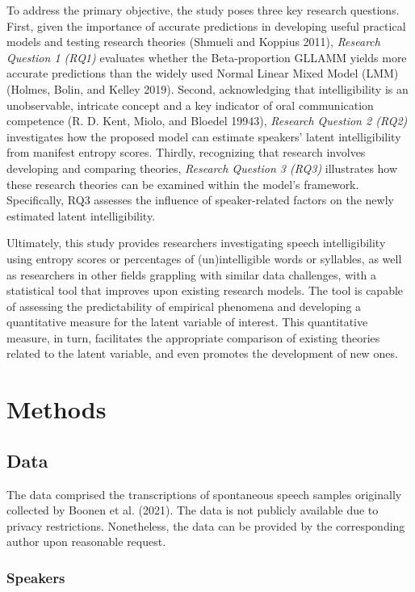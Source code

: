 \documentclass[
sn-apacite
]{sn-jnl}
\begin{document}
To address the primary objective, the study poses three key research
questions. First, given the importance of accurate predictions in
developing useful practical models and testing research theories
(Shmueli and Koppius 2011), \emph{Research Question 1 (RQ1)} evaluates
whether the Beta-proportion GLLAMM yields more accurate predictions than
the widely used Normal Linear Mixed Model (LMM) (Holmes, Bolin, and
Kelley 2019). Second, acknowledging that intelligibility is an
unobservable, intricate concept and a key indicator of oral
communication competence (R. D. Kent, Miolo, and Bloedel 19943),
\emph{Research Question 2 (RQ2)} investigates how the proposed model can
estimate speakers' latent intelligibility from manifest entropy scores.
Thirdly, recognizing that research involves developing and comparing
theories, \emph{Research Question 3 (RQ3)} illustrates how these
research theories can be examined within the model's framework.
Specifically, RQ3 assesses the influence of speaker-related factors on
the newly estimated latent intelligibility.

{Ultimately, this study provides researchers investigating speech
intelligibility using entropy scores or percentages of (un)intelligible
words or syllables, as well as researchers in other fields grappling
with similar data challenges, with a statistical tool that improves upon
existing research models. The tool is capable of assessing the
predictability of empirical phenomena and developing a quantitative
measure for the latent variable of interest. This quantitative measure,
in turn, facilitates the appropriate comparison of existing theories
related to the latent variable, and even promotes the development of new
ones.}

\section{Methods}\label{sec-methods}

\subsection{Data}\label{sec-M-D}

The data comprised the transcriptions of spontaneous speech samples
originally collected by Boonen et al. (2021). The data is not publicly
available due to privacy restrictions. Nonetheless, the data can be
provided by the corresponding author upon reasonable request.

\subsubsection{Speakers}\label{sec-M-S}
\end{document}
